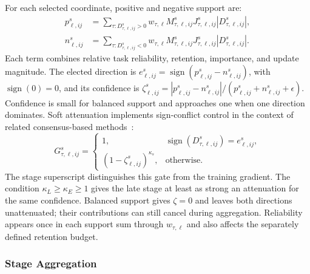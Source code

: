 \documentclass[fleqn,10pt]{wlscirep}
\begin{document}
For each selected coordinate, positive and negative support are:
\begin{equation}
\begin{aligned}
p_{\ell,ij}^{s}
&=\sum_{\tau:D_{\tau,\ell,ij}^{s}>0}
w_{\tau,\ell}M_{\tau,\ell,ij}^{s}J_{\tau,\ell,ij}^{s}
|D_{\tau,\ell,ij}^{s}|,\\
n_{\ell,ij}^{s}
&=\sum_{\tau:D_{\tau,\ell,ij}^{s}<0}
w_{\tau,\ell}M_{\tau,\ell,ij}^{s}J_{\tau,\ell,ij}^{s}
|D_{\tau,\ell,ij}^{s}|.
\end{aligned}
\label{eq:early_positive_support}
\end{equation}
Each term combines relative task reliability, retention, importance, and update magnitude. The elected direction is $e_{\ell,ij}^{s}=\operatorname{sign}(p_{\ell,ij}^{s}-n_{\ell,ij}^{s})$, with $\operatorname{sign}(0)=0$, and its confidence is $\zeta_{\ell,ij}^{s}=|p_{\ell,ij}^{s}-n_{\ell,ij}^{s}|/ (p_{\ell,ij}^{s}+n_{\ell,ij}^{s}+\epsilon)$. Confidence is small for balanced support and approaches one when one direction dominates. Soft attenuation implements sign-conflict control in the context of related consensus-based methods~\cite{catmerging2025,calm2025,wudi2025,cabs2025}:
\begin{equation}
G_{\tau,\ell,ij}^{s}
=\begin{cases}
1,&\operatorname{sign}(D_{\tau,\ell,ij}^{s})=e_{\ell,ij}^{s},\\
(1-\zeta_{\ell,ij}^{s})^{\kappa_s},&\text{otherwise}.
\end{cases}
\label{eq:early_conflict_gate}
\end{equation}
The stage superscript distinguishes this gate from the training gradient. The condition $\kappa_L\geq\kappa_E\geq1$ gives the late stage at least as strong an attenuation for the same confidence. Balanced support gives $\zeta=0$ and leaves both directions unattenuated; their contributions can still cancel during aggregation. Reliability appears once in each support sum through $w_{\tau,\ell}$ and also affects the separately defined retention budget.

\subsubsection{Stage Aggregation}
\label{subsubsec:early_aggregation}
\label{subsubsec:late_aggregation}
\label{subsubsec:final_model}
\end{document}
